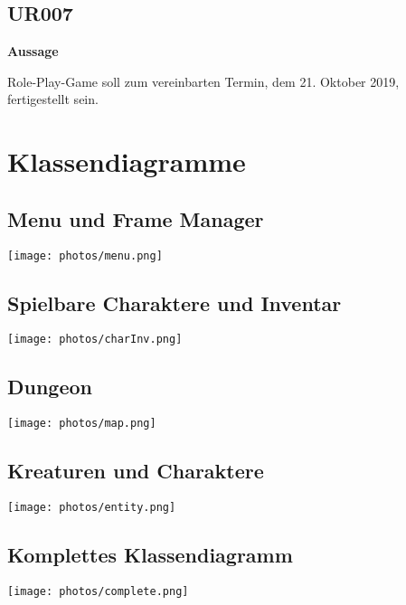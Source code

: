     \subsection{UR007}
        \hspace*{10mm} \textbf{Aussage} 
            \begin{addmargin}{20mm}
                Role-Play-Game soll zum vereinbarten Termin, dem 21. Oktober 2019, fertigestellt sein.
            \end{addmargin}
\newpage
    \section{Klassendiagramme}
        \subsection{Menu und Frame Manager}
            \begin{center}
                 \texttt{[image: photos/menu.png]}
            \end{center}
        \subsection{Spielbare Charaktere und Inventar}
            \begin{center}
                \texttt{[image: photos/charInv.png]}
            \end{center}
         \subsection{Dungeon}
            \begin{center}
                \texttt{[image: photos/map.png]}
            \end{center}
        \subsection{Kreaturen und Charaktere}
            \begin{center}
                \texttt{[image: photos/entity.png]}
            \end{center}
        \subsection{Komplettes Klassendiagramm}
            \begin{center}
                \texttt{[image: photos/complete.png]}
            \end{center}
            
